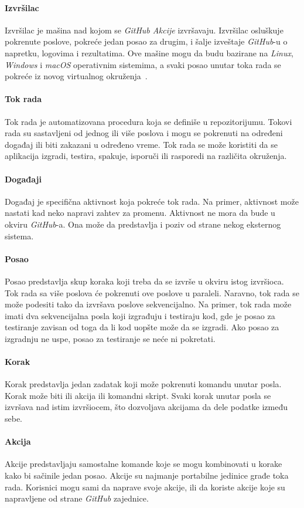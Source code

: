 \paragraph{Izvršilac}
Izvršilac je mašina nad kojom se \textit{GitHub Akcije} izvršavaju. Izvršilac osluškuje pokrenute poslove,
pokreće jedan posao za drugim, i šalje izveštaje \textit{GitHub}-u o napretku, logovima i rezultatima. Ove 
mašine mogu da budu bazirane na \textit{Linux}, \textit{Windows} i \textit{macOS} operativnim sistemima, a svaki posao 
unutar toka rada se pokreće iz novog virtualnog okruženja~\cite{GitHubActions}.

\paragraph{Tok rada}
Tok rada je automatizovana procedura koja se definiše u repozitorijumu. Tokovi rada su sastavljeni 
od jednog ili više poslova i mogu se pokrenuti na određeni događaj ili biti zakazani u određeno vreme. 
Tok rada se može koristiti da se aplikacija izgradi, testira, spakuje, isporuči ili rasporedi na 
različita okruženja.

\paragraph{Događaji}
Događaj je specifična aktivnost koja pokreće tok rada. Na primer, aktivnost može nastati kad neko napravi 
zahtev za promenu. Aktivnost ne mora da bude u okviru \textit{GitHub}-a. Ona može da predstavlja i poziv od strane 
nekog eksternog sistema.

\paragraph{Posao}
Posao predstavlja skup koraka koji treba da se izvrše u okviru istog izvršioca. Tok rada sa više poslova 
će pokrenuti ove poslove u paraleli. Naravno, tok rada se može podesiti tako da izvršava poslove 
sekvencijalno. Na primer, tok rada može imati dva sekvencijalna posla koji izgrađuju i testiraju kod, 
gde je posao za testiranje zavisan od toga da li kod uopšte može da se izgradi. Ako posao za izgradnju 
ne uspe, posao za testiranje se neće ni pokretati.

\paragraph{Korak}
Korak predstavlja jedan zadatak koji može pokrenuti komandu unutar posla. Korak može biti ili akcija ili 
komandni skript. Svaki korak unutar posla se izvršava nad istim izvršiocem, što dozvoljava akcijama da 
dele podatke između sebe.

\paragraph{Akcija}
Akcije predstavljaju samostalne komande koje se mogu kombinovati u korake kako bi sačinile jedan posao.
Akcije su najmanje portabilne jedinice građe toka rada. Korisnici mogu sami da naprave svoje akcije,
ili da koriste akcije koje su napravljene od strane \textit{GitHub} zajednice. 
